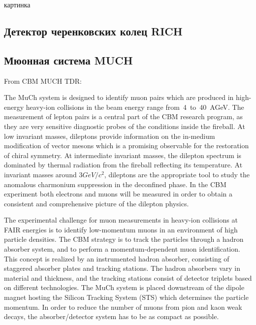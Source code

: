 \todo картинка

\subsection{Детектор черенковских колец RICH}\label{sec:secRICH}



\subsection{Мюонная система MUCH}\label{sec:secMUCH}

From CBM MUCH TDR:

The MuCh system is designed to identify muon pairs which are produced in high-energy heavy-ion collisions in the beam energy range from~4~to~40~AGeV. The measurement of lepton pairs is a central part of the CBM research program, as they are very sensitive diagnostic probes of the conditions inside the fireball. At low invariant masses, dileptons provide information on the in-medium modification of vector mesons which is a promising observable for the restoration of chiral symmetry. At intermediate invariant masses, the dilepton spectrum is dominated by thermal radiation from the fireball reflecting its temperature. At invariant masses around $ 3 GeV/c^{2} $, dileptons are the appropriate tool to study the anomalous charmonium suppression in the deconfined phase. In the CBM experiment both electrons and muons will be measured in order to obtain a consistent and comprehensive picture of the dilepton physics.

The experimental challenge for muon measurements in heavy-ion collisions at FAIR energies is to identify low-momentum muons in an environment of high particle densities. The CBM strategy is to track the particles through a hadron absorber system, and to perform a momentum-dependent muon identification. This concept is realized by an instrumented hadron absorber, consisting of staggered absorber plates and tracking stations. The hadron absorbers vary in material and thickness, and the tracking stations consist of detector triplets based on different technologies. The MuCh system is placed downstream of the dipole magnet hosting the Silicon Tracking System (STS) which determines the particle momentum. In order to reduce the number of muons from pion and kaon weak decays, the absorber/detector system has to be as compact as possible.

